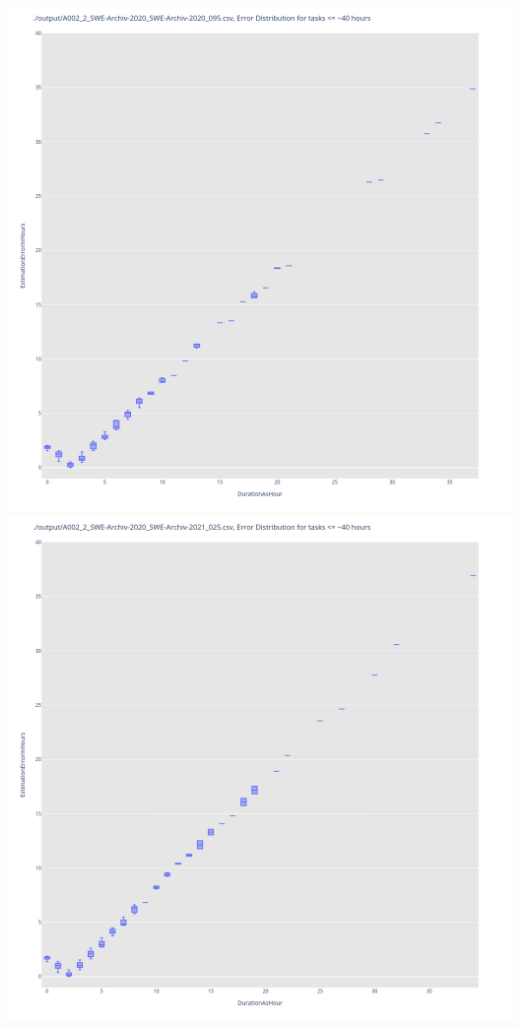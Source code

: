 \includegraphics[width=\textwidth]{Scripts/output/A002_2_SWE-Archiv-2020_SWE-Archiv-2020_095.csv.error_distribution.png}
\includegraphics[width=\textwidth]{Scripts/output/A002_2_SWE-Archiv-2020_SWE-Archiv-2021_025.csv.error_distribution.png}
